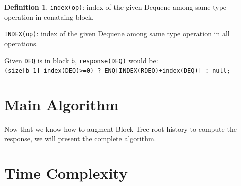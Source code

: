 \documentclass[10pt]{article}
\theoremstyle{definition}
\newtheorem{definition}{Definition}
\begin{document}
\begin{definition}
  \texttt{index(op)}: index of the given Dequene among same type operation in conataing block.
  
  \texttt{INDEX(op)}: index of the given Dequene among same type operation in all operations.
  
\end{definition}

Given \texttt{DEQ} is in block \texttt{b}, \texttt{response(DEQ)} would be:\\
\texttt{(size[b-1]-index(DEQ)>=0) ? ENQ[INDEX(RDEQ)+index(DEQ)] : null;}

\section{Main Algorithm}
\paragraph{}
Now that we know how to augment Block Tree root history to compute the response, we will present the complete algorithm.

\section{Time Complexity}




\end{document}
